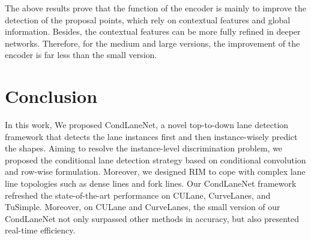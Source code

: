 \documentclass[10pt,twocolumn,letterpaper]{article}
\begin{document}
The above results prove that the function of the encoder is mainly to improve the detection of the proposal points, which rely on contextual features and global information.
Besides, the contextual features can be more fully refined in deeper networks. Therefore, for the medium and large versions, 
the improvement of the encoder is far less than the small version.


\section{Conclusion}
In this work, We proposed CondLaneNet, a novel top-to-down lane detection framework that detects the lane instances first and then instance-wisely predict the shapes. Aiming to resolve the instance-level discrimination problem, we proposed the conditional lane detection strategy based on conditional convolution and row-wise formulation. Moreover, we designed RIM to cope with complex lane line topologies such as dense lines and fork lines. Our CondLaneNet framework refreshed the state-of-the-art performance on CULane, CurveLanes, and TuSimple. Moreover, on CULane and CurveLanes, the small version of our CondLaneNet not only surpassed other methods in accuracy, but also presented real-time efficiency.


{\small


}
\end{document}
